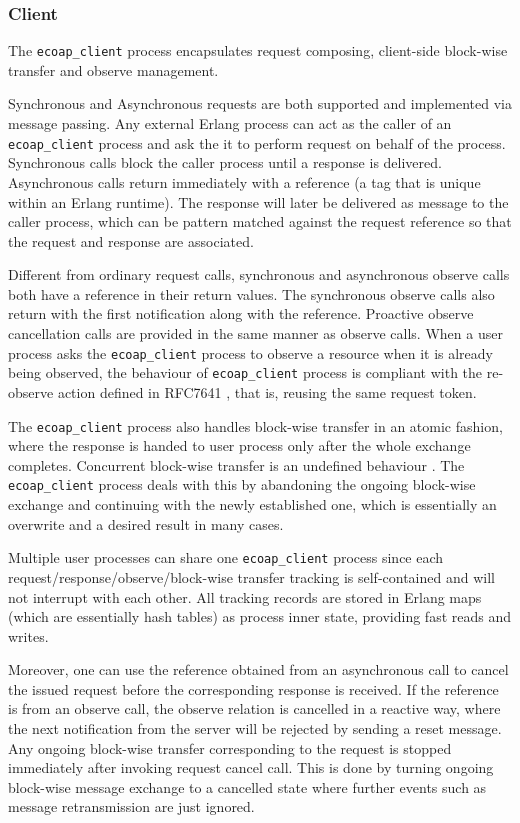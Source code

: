 \subsubsection{Client}

The \verb|ecoap_client| process encapsulates request composing, client-side block-wise transfer and observe management. 

Synchronous and Asynchronous requests are both supported and implemented via message passing. Any external Erlang process can act as the caller of an \verb|ecoap_client| process and ask the it to perform request on behalf of the process. Synchronous calls block the caller process until a response is delivered. Asynchronous calls return immediately with a reference (a tag that is unique within an Erlang runtime). The response will later be delivered as message to the caller process, which can be pattern matched against the request reference so that the request and response are associated. 

Different from ordinary request calls, synchronous and asynchronous observe calls both have a reference in their return values. The synchronous observe calls also return with the first notification along with the reference. Proactive observe cancellation calls are provided in the same manner as observe calls. When a user process asks the \verb|ecoap_client| process to observe a resource when it is already being observed, the behaviour of \verb|ecoap_client| process is compliant with the re-observe action defined in RFC7641 \autocite{coap_observe}, that is, reusing the same request token.

The \verb|ecoap_client| process also handles block-wise transfer in an atomic fashion, where the response is handed to user process only after the whole exchange completes. Concurrent block-wise transfer is an undefined behaviour \autocite{blockwise}. The \verb|ecoap_client| process deals with this by abandoning the ongoing block-wise exchange and continuing with the newly established one, which is essentially an overwrite and a desired result in many cases.

Multiple user processes can share one \verb|ecoap_client| process since each request/response/observe/block-wise transfer tracking is self-contained and will not interrupt with each other. All tracking records are stored in Erlang maps (which are essentially hash tables) as process inner state, providing fast reads and writes.

Moreover, one can use the reference obtained from an asynchronous call to cancel the issued request before the corresponding response is received. If the reference is from an observe call, the observe relation is cancelled in a reactive way, where the next notification from the server will be rejected by sending a reset message. Any ongoing block-wise transfer corresponding to the request is stopped immediately after invoking request cancel call. This is done by turning ongoing block-wise message exchange to a cancelled state where further events such as message retransmission are just ignored.

